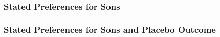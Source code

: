 \documentclass[9pt,letterpaper,subeqn]{beamer}
\begin{document}

\begin{frame}[label=DSRanalysis]
\frametitle{Stated Preferences for Sons} 

\end{frame}

\begin{frame}[label=placebo2]
  \frametitle{Stated Preferences for Sons and Placebo Outcome} 

%
%
%

\end{frame}
\end{document}
